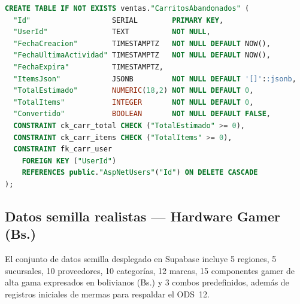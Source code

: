 \begin{lstlisting}[language=SQL, caption={DDL desplegado: esquema ventas (Pedidos, PedidoItems y CarritosAbandonados)}, label=lst:ddl-ventas]
CREATE TABLE IF NOT EXISTS ventas."CarritosAbandonados" (
  "Id"                   SERIAL        PRIMARY KEY,
  "UserId"               TEXT          NOT NULL,
  "FechaCreacion"        TIMESTAMPTZ   NOT NULL DEFAULT NOW(),
  "FechaUltimaActividad" TIMESTAMPTZ   NOT NULL DEFAULT NOW(),
  "FechaExpira"          TIMESTAMPTZ,
  "ItemsJson"            JSONB         NOT NULL DEFAULT '[]'::jsonb,
  "TotalEstimado"        NUMERIC(18,2) NOT NULL DEFAULT 0,
  "TotalItems"           INTEGER       NOT NULL DEFAULT 0,
  "Convertido"           BOOLEAN       NOT NULL DEFAULT FALSE,
  CONSTRAINT ck_carr_total CHECK ("TotalEstimado" >= 0),
  CONSTRAINT ck_carr_items CHECK ("TotalItems" >= 0),
  CONSTRAINT fk_carr_user
    FOREIGN KEY ("UserId")
    REFERENCES public."AspNetUsers"("Id") ON DELETE CASCADE
);
\end{lstlisting}

\subsection{Datos semilla realistas --- Hardware Gamer (Bs.)}

El conjunto de datos semilla desplegado en Supabase incluye 5 regiones, 5 sucursales, 10 proveedores, 10 categor\'ias, 12 marcas, 15 componentes gamer de alta gama expresados en bolivianos (Bs.) y 3 combos predefinidos, adem\'as de registros iniciales de mermas para respaldar el ODS~12.

